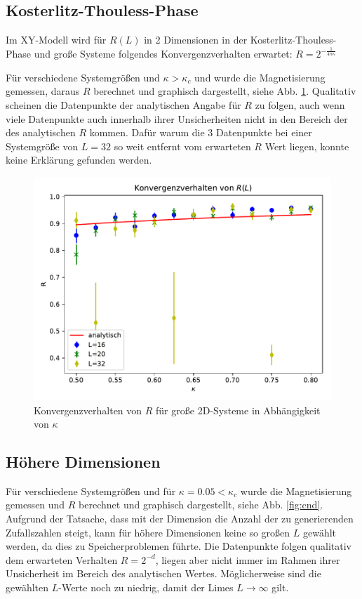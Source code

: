 \documentclass[10pt,a4paper]{article}
\begin{document}
\subsection{Kosterlitz-Thouless-Phase}
Im XY-Modell wird für $R(L)$ in 2 Dimensionen in der Kosterlitz-Thouless-Phase
und große Systeme folgendes Konvergenzverhalten erwartet:
$R= 2^{-\frac{1}{4\pi \kappa}}$

Für verschiedene Systemgrößen und $\kappa > \kappa_c$ und  wurde die Magnetisierung
gemessen, daraus $R$ berechnet und graphisch dargestellt,
siehe Abb. \ref{fig:c2d}. Qualitativ  scheinen die
Datenpunkte der analytischen Angabe für $R$ zu folgen, auch
wenn viele Datenpunkte auch innerhalb ihrer Unsicherheiten
nicht in den Bereich der des analytischen $R$ kommen. Dafür
warum
die 3 Datenpunkte bei einer Systemgröße von $L=32$ so weit
entfernt vom erwarteten $R$ Wert liegen, konnte keine Erklärung gefunden werden.

\begin{figure}
  \centering
  \includegraphics[width=\textwidth]{../figures/conv_2d.pdf}
  \caption{Konvergenzverhalten von $R$ für große 2D-Systeme in Abhängigkeit von $\kappa$}\label{fig:c2d}
\end{figure}



\subsection{Höhere Dimensionen}

Für verschiedene Systemgrößen und für
$\kappa=0.05<\kappa_c$ wurde die Magnetisierung
gemessen und $R$ berechnet und graphisch dargestellt,
siehe Abb. \ref{fig:cnd}.
Aufgrund der Tatsache, dass mit der Dimension die Anzahl
der zu generierenden Zufallszahlen steigt, kann für höhere
Dimensionen keine so großen $L$ gewählt werden, da dies zu
Speicherproblemen führte.
Die Datenpunkte folgen qualitativ dem erwarteten Verhalten
$R=2^{-d}$, liegen aber nicht immer im Rahmen ihrer
Unsicherheit im Bereich des analytischen Wertes.
Möglicherweise sind die gewählten $L$-Werte noch zu
niedrig, damit der Limes $L \rightarrow \infty$ gilt.
\end{document}
